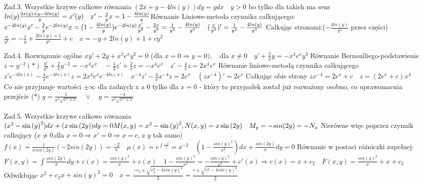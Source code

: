 \documentclass{article}
\begin{document}
Zad.3.
\newline
\newline
Wszystkie krzywe całkowe równania
$
(2x+y-4ln(y))dy=ydx\quad y>0$ bo tylko dla takich  ma sens$ln(y)\newline
\frac{2x(y)+y-4ln(y)}{y}=x'(y)\quad x'-\frac{2}{y}x=1-\frac{4ln(y)}{y}\newline
$Równanie Liniowe-metoda czynnika całkującego:
$
e^{-2ln(y)}x'-\frac{2}{y}e^{-2ln(y)}x=(1-\frac{4ln(y)}{y})e^{-2ln(y)}
\newline
\frac{x'}{y^2}-\frac{2x}{y^3}=\frac{1}{y^2}-\frac{4ln(y)}{y^3}
\quad
(\frac{x}{y^2})'=\frac{1}{y^2}-\frac{4ln(y)}{y^3}
$\newline
Całkując stronami:($-\frac{4ln(y)}{y^3}$ przez części)
$
\frac{x}{y^2}=-\frac{1}{y}+\frac{2ln(y)+1}{y^2}+c
\quad
\underline{x=-y+2ln(y)+1+cy^2}
$
\newline
\newline

Zad.4.
\newline
\newline
Rozwiązanie ogólne $xy'+2y+x^5e^xy^3=0$\newline
$
$(dla $x=0\Rightarrow y=0), \quad $dla $x\neq0\quad y'+\frac{2}{x}y=-x^4e^xy^3
$
Równanie Bernoulliego-podstawienie $z=y^{-2} (*)$
$
\frac{y'}{y^3}+\frac{2}{x}y^{-2}=-x^4e^x
\quad -\frac{1}{2}z'+\frac{2}{x}z=-x^4e^x
\quad z'-\frac{4}{x}z=2x^4e^x
$\newline
Równanie liniowe-metodą czynnika całkującego\quad
$
z'e^{-4ln(x)}-\frac{4}{x}e^{-4ln(x)}z=2x^4e^xe^{-4ln(x)}
\quad x^{-4}z'-\frac{4}{x}x^{-4}z=2e^x
\quad (zx^{-4})'=2e^x
$\newline
Całkując obie strony
$
zx^{-4}=2e^x+c
\quad
z=(2e^x+c)x^4
$\newline
Co nie przyjmuje wartości $\pm\infty$ dla żadnych x a 0 tylko dla $x=0$ - który to przypadek został już rozważony osobno, co uprawomacnia przejście (*)\newline
$
\underline{y=\frac{1}{x^2\sqrt{e^x+c}}\quad\vee\quad y=\frac{-1}{x^2\sqrt{e^x+c}}}
$
\newline
\newline

Zad.5.
\newline
\newline
Wszystkie krzywe całkowe równania
$
(x^2-\sin{(y)}^2)dx+(x\sin{(2y)})dy=0
\newline
M(x,y)=x^2-\sin{(y)}^2,
N(x,y)=x\sin{(2y)}
\quad
M_y=-sin(2y)=-N_x
$\newline
Nierówne więc poprzez czynnik całkujący ($x\neq 0$,dla $x=0\Rightarrow x'=0\Rightarrow x=c$, z $y$ tak samo)
$
f(x)=\frac{1}{xsin(2y)}(-2sin(2y))=\frac{-2}{x}\quad
\mu(x)=e^{\int\frac{-2}{x}}=x^{-2}
\quad
(1-\frac{sin(y)^2}{x^2})dx+\frac{sin(2y)}{x}dy=0
$\newline
Równanie w postaci różniczki zupełnej:
$
F(x,y)=\int\frac{sin(2y)}{x}dy+c(x)=\frac{sin(y)^2}{x}+c(x)
\quad
1-\frac{sin(y)^2}{x^2}=-\frac{sin(y)^2}{x^2}+c'(x)\Rightarrow c(x)=x+c_2
\quad
F(x,y)=\frac{sin(y)^2}{x}+x+c_2
$\newline
Odwikłując
$
x^2+c_3x+sin(y)^2=0
\quad
x=\frac{-c_3\pm\sqrt{c_3^2-4sin(y)^2}}{2}=\underline{\frac{c\pm\sqrt{c^2-4sin(y)^2}}{2}}
$
\end{document}
